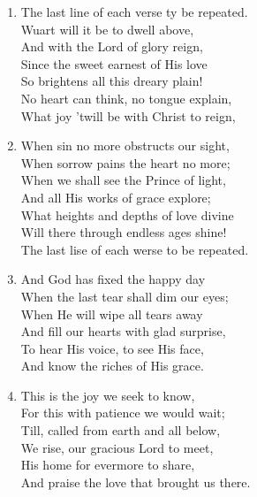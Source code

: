 \documentclass[11pt,a4paper]{article}
\begin{document}
\begin{enumerate}
    \item The last line of each verse ty be repeated. \\
        Wuart will it be to dwell above, \\
        And with the Lord of glory reign, \\
        Since the sweet earnest of His love \\
        So brightens all this dreary plain! \\
        No heart can think, no tongue explain, \\
        What joy 'twill be with Christ to reign,

    \item When sin no more obstructs our sight, \\
        When sorrow pains the heart no more; \\
        When we shall see the Prince of light, \\
        And all His works of grace explore; \\
        What heights and depths of love divine \\
        Will there through endless ages shine! \\
        The last lise of each werse to be repeated.

    \item And God has fixed the happy day \\
        When the last tear shall dim our eyes; \\
        When He will wipe all tears away \\
        And fill our hearts with glad surprise, \\
        To hear His voice, to see His face, \\
        And know the riches of His grace.

    \item This is the joy we seek to know, \\
        For this with patience we would wait; \\
        Till, called from earth and all below, \\
        We rise, our gracious Lord to meet, \\
        His home for evermore to share, \\
        And praise the love that brought us there.

\end{enumerate}
\end{document}
